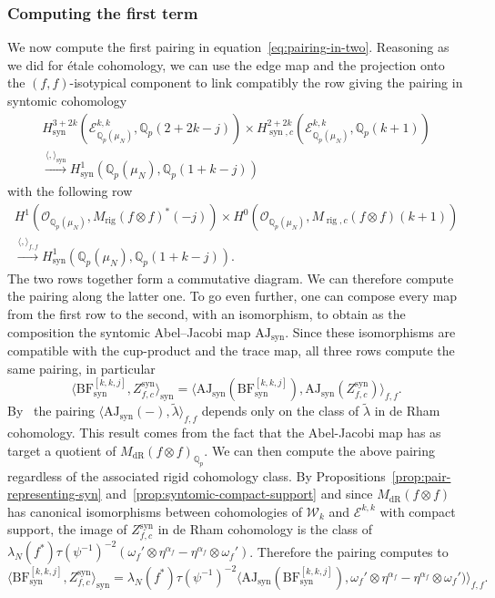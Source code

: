 \documentclass[11pt, a4paper, reqno]{amsart}
\theoremstyle{definition}
\theoremstyle{plain}
\theoremstyle{remark}
\DeclareMathOperator{\syn}{syn}
\DeclareMathOperator{\rig}{rig}
\DeclareMathOperator{\dR}{dR}
\newcommand{\numberset}{\mathbb}
\newcommand{\Q}{\numberset{Q}}
\newcommand{\ringint}{\mathcal}
\newcommand{\Ell}{\mathcal{E}}
\newcommand{\KS}{\mathscr{W}}
\newcommand{\BF}{\mathrm{BF}}
\newcommand{\AJ}{\mathrm{AJ}}
\begin{document}
\subsubsection*{Computing the first term}
We now compute the first pairing in equation~\eqref{eq:pairing-in-two}. Reasoning as we did for étale cohomology, we can use the edge map and the projection onto the $(f,f)$-isotypical component to link compatibly the row giving the pairing in syntomic cohomology
\begin{multline*}
    H^{3+2k}_{\syn}(\Ell^{k,k}_{\Q_p(\mu_N)},\Q_p(2+2k-j)) \times H^{2+2k}_{\syn,c}(\Ell^{k,k}_{\Q_p(\mu_N)},\Q_p(k+1)) \\
    \xrightarrow{\langle , \rangle_{\syn}} H^1_{\syn}(\Q_p(\mu_N),\Q_p(1+k-j))
\end{multline*}
with the following row
\begin{multline*}
        H^1(\ringint{O}_{\Q_p(\mu_N)},M_{\rig}(f\otimes f)^*(-j)) \times H^0(\ringint{O}_{\Q_p(\mu_N)},M_{\rig,c}(f\otimes f)(k+1)) \\
    \xrightarrow{\langle , \rangle_{f,f}} H^1_{\syn}(\Q_p(\mu_N),\Q_p(1+k-j)).
\end{multline*}
The two rows together form a commutative diagram. We can therefore compute the pairing along the latter one. To go even further, one can compose every map from the first row to the second, with an isomorphism, to obtain as the composition the syntomic Abel--Jacobi map $\AJ_{\syn}$. Since these isomorphisms are compatible with the cup-product and the trace map, all three rows compute the same pairing, in particular
\[
    \langle \BF^{[k,k,j]}_{\syn},Z_{f,c}^{\syn}\rangle_{\syn} = \langle \AJ_{\syn}(\BF^{[k,k,j]}_{\syn}),\AJ_{\syn}(Z_{f,c}^{\syn})\rangle_{f,f}.
\]
By~\cite[Proposition~6.3.1]{KLZ20} the pairing $\langle \AJ_{\syn}(-), \tilde{\lambda} \rangle_{f,f}$ depends only on the class of $\tilde{\lambda}$ in de Rham cohomology. This result comes from the fact that the Abel-Jacobi map has as target a quotient of $M_{\dR}(f\otimes f)_{\Q_p}$. We can then compute the above pairing regardless of the associated rigid cohomology class. By Propositions~\ref{prop:pair-representing-syn} and~\ref{prop:syntomic-compact-support} and since $M_{\dR}(f\otimes f)$ has canonical isomorphisms between cohomologies of $\KS_k$ and $\Ell^{k,k}$ with compact support, the image of $Z_{f,c}^{\syn}$ in de Rham cohomology is the class of $\lambda_N(f^*)\tau(\psi^{-1})^{-2}(\omega_f'\otimes\eta^{\alpha_f} -\eta^{\alpha_f}\otimes\omega_f')$. Therefore the pairing computes to
\[
 \langle \BF^{[k,k,j]}_{\syn},Z_{f,c}^{\syn}\rangle_{\syn} = \lambda_N(f^*)\tau(\psi^{-1})^{-2}\langle \AJ_{\syn}(\BF^{[k,k,j]}_{\syn}),\omega_f'\otimes\eta^{\alpha_f} -\eta^{\alpha_f}\otimes\omega_f')\rangle_{f,f}.
\]
\end{document}

